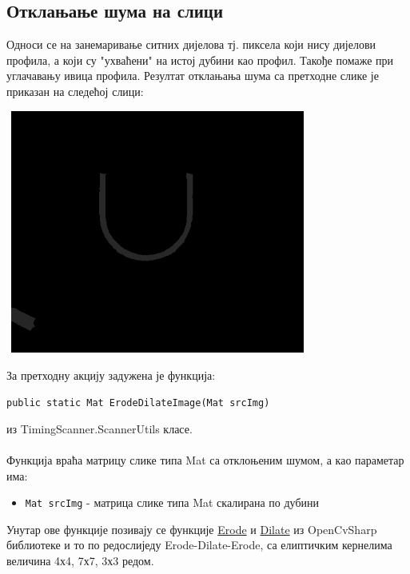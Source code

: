 \documentclass[12pt]{article}
\begin{document}
\subsection{Отклањање шума на слици}
Односи се на занемаривање ситних дијелова тј. пиксела који нису дијелови профила, а који су "ухваћени" на истој дубини као профил. Такође помаже при углачавању ивица профила. Резултат отклањања шума са претходне слике је приказан на следећој слици:
\vspace{0.5cm}
\begin{center}
    \centering 
    \includegraphics[height=8cm, width=10cm]{images/3_erode_dilate.png}
\end{center}
\vspace{0.5cm}
За претходну акцију задужена је функција:
\begin{center}
\texttt{public static Mat ErodeDilateImage(Mat srcImg)}
\end{center}
из TimingScanner.ScannerUtils класе.\\\\
Функција враћа матрицу слике типа Mat са отклоњеним шумом, а као параметар има:
\begin{itemize}
    \item \texttt{Mat srcImg} - матрица слике типа Mat скалирана по дубини
\end{itemize}
Унутар ове функције позивају се функције \href{https://shimat.github.io/opencvsharp\_docs/html/6bfd2ddd-6fb6-ce1e-a07c-28317b1e8bc6.htm}{Erode} и \href{https://shimat.github.io/opencvsharp_docs/html/c5e6c07a-feae-9588-e690-703911dd81dc.htm}{Dilate} из OpenCvSharp библиотеке и то по редослиједу Erode-Dilate-Erode, са елиптичким кернелима величина 4х4, 7х7, 3х3 редом.

\newpage
\end{document}
